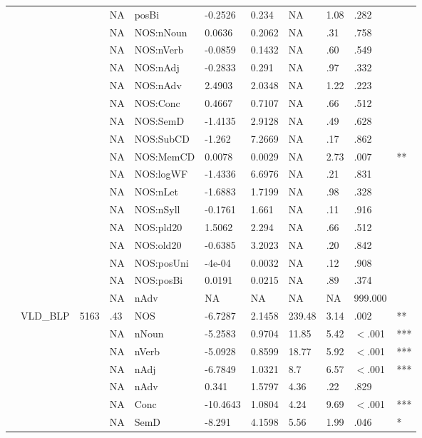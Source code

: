 \begin{table}[ht]
\begin{tabular}{lllllllllll}
   &  &  & NA & posBi & -0.2526 & 0.234 & NA & 1.08 & .282 &   \\ 
   &  &  & NA & NOS:nNoun & 0.0636 & 0.2062 & NA & .31 & .758 &   \\ 
   &  &  & NA & NOS:nVerb & -0.0859 & 0.1432 & NA & .60 & .549 &   \\ 
   &  &  & NA & NOS:nAdj & -0.2833 & 0.291 & NA & .97 & .332 &   \\ 
   &  &  & NA & NOS:nAdv & 2.4903 & 2.0348 & NA & 1.22 & .223 &   \\ 
   &  &  & NA & NOS:Conc & 0.4667 & 0.7107 & NA & .66 & .512 &   \\ 
   &  &  & NA & NOS:SemD & -1.4135 & 2.9128 & NA & .49 & .628 &   \\ 
   &  &  & NA & NOS:SubCD & -1.262 & 7.2669 & NA & .17 & .862 &   \\ 
   &  &  & NA & NOS:MemCD & 0.0078 & 0.0029 & NA & 2.73 & .007 & ** \\ 
   &  &  & NA & NOS:logWF & -1.4336 & 6.6976 & NA & .21 & .831 &   \\ 
   &  &  & NA & NOS:nLet & -1.6883 & 1.7199 & NA & .98 & .328 &   \\ 
   &  &  & NA & NOS:nSyll & -0.1761 & 1.661 & NA & .11 & .916 &   \\ 
   &  &  & NA & NOS:pld20 & 1.5062 & 2.294 & NA & .66 & .512 &   \\ 
   &  &  & NA & NOS:old20 & -0.6385 & 3.2023 & NA & .20 & .842 &   \\ 
   &  &  & NA & NOS:posUni & -4e-04 & 0.0032 & NA & .12 & .908 &   \\ 
   &  &  & NA & NOS:posBi & 0.0191 & 0.0215 & NA & .89 & .374 &   \\ 
   &  &  & NA & nAdv & NA & NA & NA & NA & 999.000 &  \\ 
   & VLD\_BLP & 5163 & .43 & NOS & -6.7287 & 2.1458 & 239.48 & 3.14 & .002 & ** \\ 
   &  &  & NA & nNoun & -5.2583 & 0.9704 & 11.85 & 5.42 & $<$.001 & *** \\ 
   &  &  & NA & nVerb & -5.0928 & 0.8599 & 18.77 & 5.92 & $<$.001 & *** \\ 
   &  &  & NA & nAdj & -6.7849 & 1.0321 & 8.7 & 6.57 & $<$.001 & *** \\ 
   &  &  & NA & nAdv & 0.341 & 1.5797 & 4.36 & .22 & .829 &   \\ 
   &  &  & NA & Conc & -10.4643 & 1.0804 & 4.24 & 9.69 & $<$.001 & *** \\ 
   &  &  & NA & SemD & -8.291 & 4.1598 & 5.56 & 1.99 & .046 & * \\ 

\end{tabular}
\end{table}
